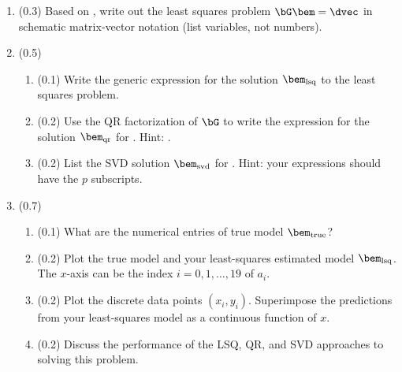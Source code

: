 \documentclass[11pt,titlepage,fleqn]{article}
\begin{document}
\begin{enumerate}
\item (0.3) Based on , write out the least squares problem $\bG\bem = \dvec$ in schematic matrix-vector notation (list variables, not numbers).


\item (0.5) 

\begin{enumerate}
\item (0.1) Write the generic expression for the solution $\bem_{\rm lsq}$ to the least squares problem.
\item (0.2) Use the QR factorization of $\bG$ to write the expression for the solution $\bem_{\rm qr}$ for \makebox{$\bG\bem = \dvec$}. Hint: \citet[][Appendix A]{Aster}.

\item (0.2) List the SVD solution $\bem_{\rm svd}$ for \makebox{$\bG\bem = \dvec$}. Hint: your expressions should have the $p$ subscripts.
\end{enumerate}

\item (0.7)

\begin{enumerate}
\item (0.1) What are the numerical entries of true model $\bem_{\rm true}$?

\item (0.2) Plot the true model and your least-squares estimated model $\bem_{\rm lsq}$. The $x$-axis can be the index $i = 0,1,\ldots,19$ of $a_i$.

\item (0.2) Plot the discrete data points $(x_i,y_i)$. Superimpose the predictions from your least-squares model as a continuous function of $x$.


\item (0.2) Discuss the performance of the LSQ, QR, and SVD approaches to solving this problem.

\end{enumerate}

%

\end{enumerate}
\end{document}
